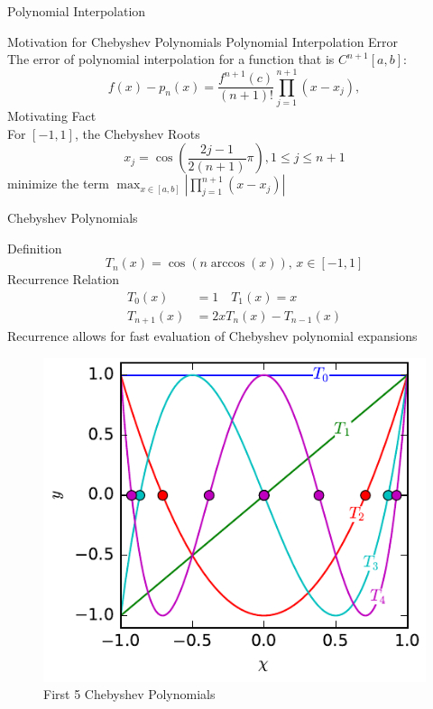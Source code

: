 \documentclass[final]{beamer}
\begin{document}
\begin{frame}[fragile]{}
\begin{columns}[t]
\begin{column}{.31\linewidth}
\begin{block}{Polynomial Interpolation}
\begin{minipage}{.4\linewidth}
\begin{figure}
	\end{figure}
	\end{minipage}%
\end{block}
\begin{block}{Motivation for Chebyshev Polynomials}
{\color{numhypRed} Polynomial Interpolation Error \cite[Thm.\ 3.1.1]{davis_1975}}\\
The error of polynomial interpolation for a function that is $C^{n+1}[a,b]$:
$$f(x)-p_n(x) = \frac{f^{n+1}(c)}{(n+1)!}\prod_{j=1}^{n+1}(x-x_j),$$														%
{\color{numhypRed}  Motivating Fact \cite[Thm.\ 3.3.4]{davis_1975}}\\
For $[-1,1]$, the Chebyshev Roots
$$x_j=\cos\left(\frac{2j-1}{2(n+1)}\pi\right), 1\leq j\leq n+1$$
minimize the term $\max_{x\in[a,b]}\left|\prod_{j=1}^{n+1}(x-x_j)\right|$
\end{block}


\begin{block}{Chebyshev Polynomials}
\begin{minipage}{.5\textwidth}
{\color{numhypRed} Definition}
$$T_n(x)=\cos\left(n\arccos(x)\right),\, x\in[-1,1]$$
{\color{numhypRed} Recurrence Relation}
\begin{align*}
T_0(x) &= 1\quad T_1(x) = x\\
T_{n+1}(x) &= 2xT_n(x)-T_{n-1}(x)
\end{align*}
Recurrence allows for fast evaluation of Chebyshev polynomial expansions
\end{minipage}
\begin{minipage}{.45\textwidth}
\begin{center}
\begin{figure}
\includegraphics[width=.8\textwidth]{cheb_poly_plot.pdf}
\caption{First 5 Chebyshev Polynomials}
\end{figure}
\end{center}
\end{minipage}
\end{block}



\end{column}
\end{columns}
\end{frame}
\end{document}
